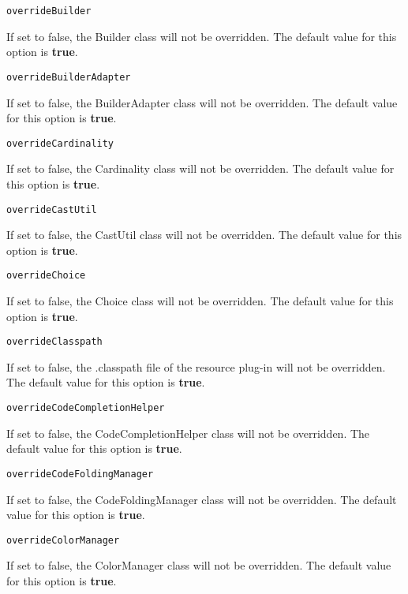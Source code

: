 \noindent\texttt{overrideBuilder}
\begin{myindentpar}{1cm}
If set to false, the Builder class will not be overridden. The default value for this option is \textbf{true}.
\end{myindentpar}

\noindent\texttt{overrideBuilderAdapter}
\begin{myindentpar}{1cm}
If set to false, the BuilderAdapter class will not be overridden. The default value for this option is \textbf{true}.
\end{myindentpar}

\noindent\texttt{overrideCardinality}
\begin{myindentpar}{1cm}
If set to false, the Cardinality class will not be overridden. The default value for this option is \textbf{true}.
\end{myindentpar}

\noindent\texttt{overrideCastUtil}
\begin{myindentpar}{1cm}
If set to false, the CastUtil class will not be overridden. The default value for this option is \textbf{true}.
\end{myindentpar}

\noindent\texttt{overrideChoice}
\begin{myindentpar}{1cm}
If set to false, the Choice class will not be overridden. The default value for this option is \textbf{true}.
\end{myindentpar}

\noindent\texttt{overrideClasspath}
\begin{myindentpar}{1cm}
If set to false, the .classpath file of the resource plug-in will not be overridden. The default value for this option is \textbf{true}.
\end{myindentpar}

\noindent\texttt{overrideCodeCompletionHelper}
\begin{myindentpar}{1cm}
If set to false, the CodeCompletionHelper class will not be overridden. The default value for this option is \textbf{true}.
\end{myindentpar}

\noindent\texttt{overrideCodeFoldingManager}
\begin{myindentpar}{1cm}
If set to false, the CodeFoldingManager class will not be overridden. The default value for this option is \textbf{true}.
\end{myindentpar}

\noindent\texttt{overrideColorManager}
\begin{myindentpar}{1cm}
If set to false, the ColorManager class will not be overridden. The default value for this option is \textbf{true}.
\end{myindentpar}

